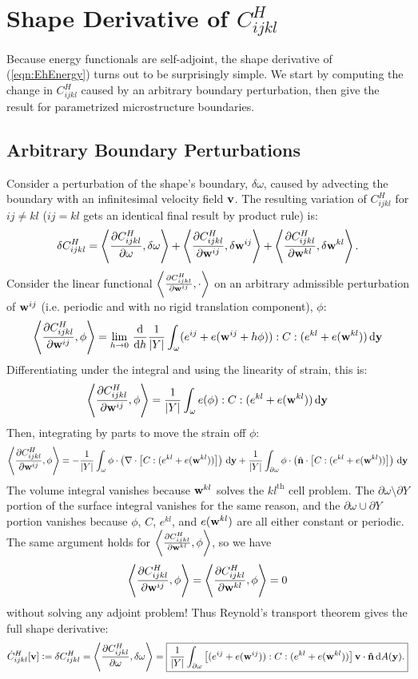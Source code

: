 \documentclass[10pt]{article}
\providecommand{\dA}{\, \mathrm{d}A}
\providecommand{\pder}[2]{\frac{\partial #1}{\partial #2}}
\providecommand{\tder}[2]{\frac{\mathrm{d} #1}{\mathrm{d} #2}}
\newcommand{\defeq}{\vcentcolon=}
\begin{document}
\section{Shape Derivative of $C^H_{ijkl}$}
Because energy functionals are self-adjoint, the shape derivative of
(\ref{eqn:EhEnergy}) turns out to be surprisingly simple. We start by computing
the change in $C^H_{ijkl}$ caused by an arbitrary boundary perturbation, then
give the result for parametrized microstructure boundaries.

\subsection{Arbitrary Boundary Perturbations}
Consider a perturbation of the shape's boundary, $\delta\omega$, caused by
advecting the boundary with an infinitesimal velocity field ${\bf v}$. The
resulting variation of $C^H_{ijkl}$ for $ij \ne kl$ ($ij = kl$ gets an
identical final result by product rule) is:
$$
\delta C^H_{ijkl} = \left<\pder{C^H_{ijkl}}{\omega}, \delta \omega\right>
    + \left<\pder{C^H_{ijkl}}{{\bf w}^{ij}}, \delta {\bf w}^{ij}\right>
    + \left<\pder{C^H_{ijkl}}{{\bf w}^{kl}}, \delta {\bf w}^{kl}\right>.
$$
Consider the linear functional
$\left<\pder{C^H_{ijkl}}{{\bf w}^{ij}}, \cdot \right>$  on an arbitrary
admissible perturbation of ${\bf w}^{ij}$ (i.e. periodic and with no rigid
translation component), $\phi$:
$$
\left<\pder{C^H_{ijkl}}{{\bf w}^{ij}}, \phi\right> =
\lim_{h \to 0} \, \tder{}{h} \frac{1}{|Y|} \int_\omega (e^{ij} + e({\bf w}^{ij} + h \phi)) : C : (e^{kl} + e({\bf w}^{kl})) \, \mathrm{d} {\bf y}
$$
Differentiating under the integral and using the linearity of strain, this is:
$$
\left<\pder{C^H_{ijkl}}{{\bf w}^{ij}}, \phi\right> =
\frac{1}{|Y|} \int_\omega e(\phi) : C : (e^{kl} + e({\bf w}^{kl})) \, \mathrm{d} {\bf y}
$$
Then, integrating by parts to move the strain off $\phi$:
$$
\left<\pder{C^H_{ijkl}}{{\bf w}^{ij}}, \phi\right> =
-\frac{1}{|Y|} \int_\omega \phi \cdot \left(\nabla \cdot \left[C : (e^{kl} + e({\bf w}^{kl}))\right]\right) \, \mathrm{d} {\bf y}
+ \frac{1}{|Y|} \int_{\partial \omega} \phi \cdot \left(\hat{{\bf n}} \cdot \left[C : (e^{kl} + e({\bf w}^{kl}))\right]\right) \, \mathrm{d} {\bf y}
$$
The volume integral vanishes because ${\bf w}^{kl}$ solves the $kl^\text{th}$
cell problem. The $\partial \omega \setminus \partial Y$ portion of the surface
integral vanishes for the same reason, and the $\partial \omega \cup \partial
Y$ portion vanishes because $\phi$, $C$, $e^{kl}$, and $e({\bf w}^{kl})$ are all
either constant or periodic. The same argument holds for
$\left<\pder{C^H_{ijkl}}{{\bf w}^{kl}}, \phi\right>$, so we have
$$
\left<\pder{C^H_{ijkl}}{{\bf w}^{ij}}, \phi\right> =
\left<\pder{C^H_{ijkl}}{{\bf w}^{kl}}, \phi\right> = 0
$$
without solving any adjoint problem!
Thus Reynold's transport theorem gives the full shape derivative:
$$
\dot{C}^H_{ijkl}[{\bf v}] \defeq
\delta C^H_{ijkl} = \left<\pder{C^H_{ijkl}}{\omega}, \delta \omega\right> =
\boxed{
\frac{1}{|Y|} \int_{\partial \omega} \left[(e^{ij} + e({\bf w}^{ij})) : C : (e^{kl} + e({\bf w}^{kl}))\right] {\bf v} \cdot {\bf \hat{n}} \dA({\bf y}).}
$$
\end{document}
